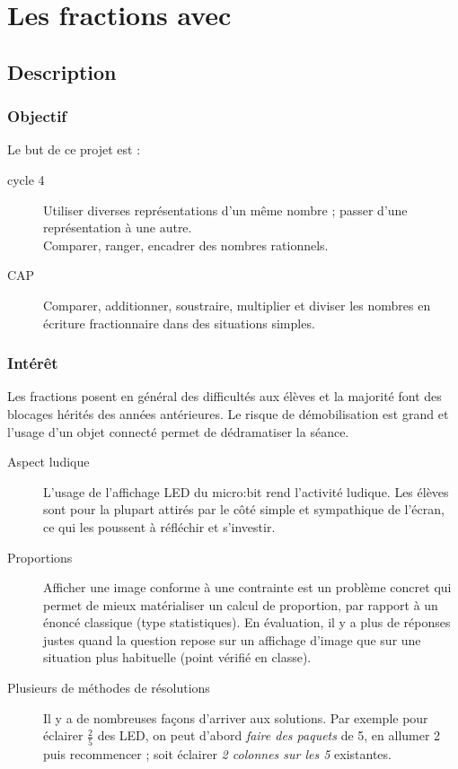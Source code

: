 

\section{Les fractions avec \mb}




\subsection{Description}

\subsubsection{Objectif}

\begin{formule}
Le but de ce projet est :
\begin{description}
    \item [cycle 4] 
        Utiliser diverses représentations d’un même nombre ; passer d’une représentation à une autre.\\
        Comparer, ranger, encadrer des nombres rationnels.
    \item [\textsc{CAP}] 
        Comparer, additionner, soustraire, multiplier et diviser les nombres en écriture fractionnaire dans des situations simples.
\end{description}

\end{formule}

\subsubsection{Intérêt}
Les fractions posent en général des difficultés aux élèves et la majorité font des blocages hérités des années antérieures. Le risque de démobilisation est grand et l'usage d'un objet connecté permet de dédramatiser la séance.

\begin{description}
    \item [Aspect ludique] L'usage de l'affichage LED du micro:bit rend l'activité ludique. Les élèves sont pour la plupart attirés par le côté simple et sympathique de l'écran, ce qui les poussent à réfléchir et s'investir.    
    \item [Proportions] Afficher une image conforme à une contrainte est un problème concret qui permet de mieux matérialiser un calcul de proportion, par rapport à un énoncé classique (type statistiques). En évaluation, il y a plus de réponses justes quand la question repose sur un affichage d'image que sur une situation plus habituelle (point vérifié en classe).
    \item [Plusieurs de méthodes de résolutions] Il y a de nombreuses façons d'arriver aux solutions. Par exemple pour éclairer $\frac{2}{5}$ des LED, on peut d'abord \emph{faire des paquets} de 5, en allumer 2 puis recommencer ; soit éclairer \emph{2 colonnes sur les 5} existantes.
\end{description}


